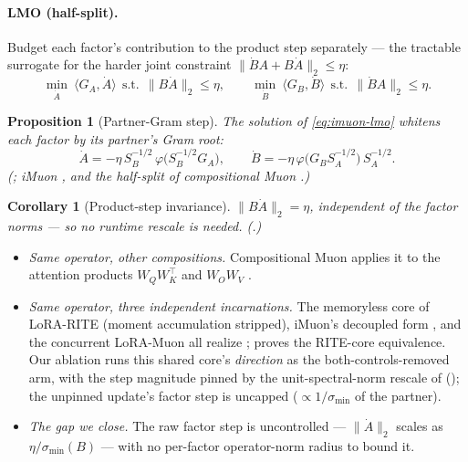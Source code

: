 \documentclass[11pt]{article}
\newcommand{\polar}{\varphi}                 %
\theoremstyle{plain}
\newtheorem{proposition}{Proposition}
\newtheorem{corollary}{Corollary}
\theoremstyle{definition}
\theoremstyle{remark}
\begin{document}
\paragraph{LMO (half-split).} Budget each factor's contribution to the product step separately --- the tractable surrogate \cite{tilde_csd} for the harder joint constraint $\|\dot B A+B\dot A\|_2\le\eta$:
\begin{equation}
  \min_{\dot A}\ \langle G_A,\dot A\rangle \ \ \text{s.t.}\ \ \|B\dot A\|_2\le\eta,
  \qquad
  \min_{\dot B}\ \langle G_B,\dot B\rangle \ \ \text{s.t.}\ \ \|\dot B A\|_2\le\eta .
  \label{eq:imuon-lmo}
\end{equation}
\begin{proposition}[Partner-Gram step]\label{prop:imuon}
The solution of \eqref{eq:imuon-lmo} whitens each factor by its partner's Gram root:
\begin{equation*}
  \dot A=-\eta\,S_B^{-1/2}\,\polar\!\big(S_B^{-1/2}G_A\big),\qquad
  \dot B=-\eta\,\polar\!\big(G_B S_A^{-1/2}\big)\,S_A^{-1/2}.
\end{equation*}
\emph{(; iMuon \cite{imuon}, and the half-split of compositional Muon \cite{tilde_csd}.)}
\end{proposition}
\begin{corollary}[Product-step invariance]\label{cor:imuon}
$\|B\dot A\|_2=\eta$, independent of the factor norms --- so no runtime rescale is needed. \emph{(.)}
\end{corollary}
\begin{itemize}[leftmargin=1.5em,itemsep=1pt,topsep=2pt]
  \item \emph{Same operator, other compositions.} Compositional Muon applies it to the attention products $W_QW_K^\top$ and $W_OW_V$ \cite{tilde_csd}.
  \item \emph{Same operator, three independent incarnations.} The memoryless core of LoRA-RITE \cite{lorarite} (moment accumulation stripped), iMuon's decoupled form \cite{imuon}, and the concurrent LoRA-Muon \cite{loramuon} all realize ; \cite{loramuon} proves the RITE-core equivalence. Our ablation runs this shared core's \emph{direction} as the both-controls-removed arm, with the step magnitude pinned by the unit-spectral-norm rescale of  (); the unpinned update's factor step is uncapped ($\propto1/\sigma_{\min}$ of the partner).
  \item \emph{The gap we close.} The raw factor step is uncontrolled --- $\|\dot A\|_2$ scales as $\eta/\sigma_{\min}(B)$ --- with no per-factor operator-norm radius to bound it.
\end{itemize}
\end{document}
